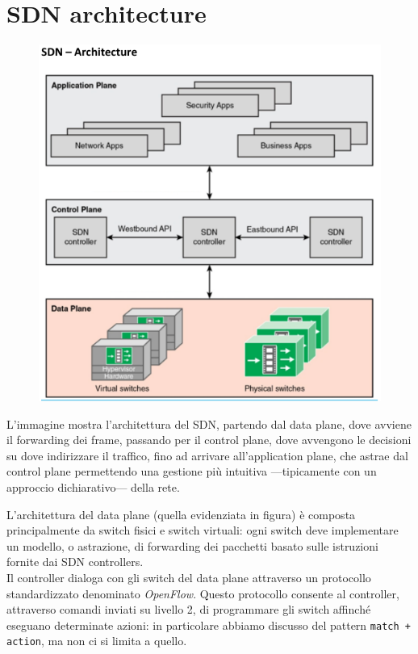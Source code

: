 \section{SDN architecture}

\begin{figure}[htbp]
   \centering
   \includegraphics{images/questions/Schermata del 2023-11-02 15-17-26.png}
   \label{fig:dom2.9}
\end{figure}

L'immagine mostra l'architettura del SDN, partendo dal data plane, dove avviene il forwarding dei frame, passando per il control plane, dove avvengono le decisioni su dove indirizzare il traffico, fino ad arrivare all'application plane, che astrae dal control plane permettendo una gestione più intuitiva ---tipicamente con un approccio dichiarativo--- della rete.

L'architettura del data plane (quella evidenziata in figura) è composta principalmente da switch fisici e switch virtuali: ogni switch deve implementare un modello, o astrazione, di forwarding dei pacchetti basato sulle istruzioni fornite dai SDN controllers.\\
Il controller dialoga con gli switch del data plane attraverso un protocollo standardizzato denominato \textit{OpenFlow}. Questo protocollo consente al controller, attraverso comandi inviati su livello 2, di programmare gli switch affinché eseguano determinate azioni: in particolare abbiamo discusso del pattern \texttt{match + action}, ma non ci si limita a quello.

